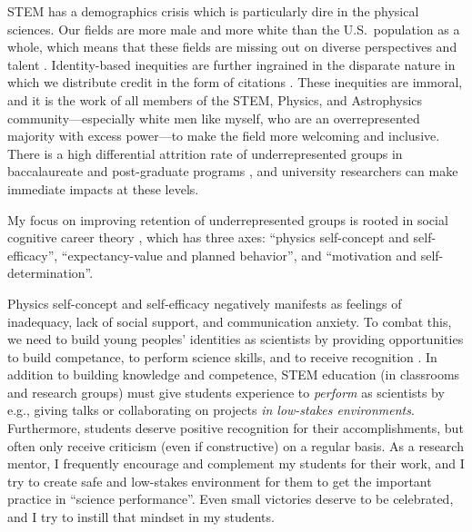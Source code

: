 \documentclass[11pt]{article}
\begin{document}
\thispagestyle{fancy}

\vspace{-0.2cm}
STEM has a demographics crisis which is particularly dire in the physical sciences. 
Our fields are more male and more white than the U.S.~population as a whole, which means that these fields are missing out on diverse perspectives and talent \citep{stem_laborforce_2021}. 
Identity-based inequities are further ingrained in the disparate nature in which we distribute credit in the form of citations \citep{teich_etal_2022}.
These inequities are immoral, and it is the work of all members of the STEM, Physics, and Astrophysics community---especially white men like myself, who are an overrepresented majority with excess power---to make the field more welcoming and inclusive.
There is a high differential attrition rate of underrepresented groups in baccalaureate and post-graduate programs \citep{whitcomb_singh_2021}, and university researchers can make immediate impacts at these levels.

My focus on improving retention of underrepresented groups is rooted in social cognitive career theory \citep{kelly_2016}, which has three axes: ``physics self-concept and self-efficacy'', ``expectancy-value and planned behavior'', and ``motivation and self-determination''.

Physics self-concept and self-efficacy negatively manifests as feelings of inadequacy, lack of social support, and communication anxiety.
To combat this, we need to build young peoples' identities as scientists by providing opportunities to build competance, to perform science skills, and to receive recognition  \citep{hazari_etal_2010}.
In addition to building knowledge and competence, STEM education (in classrooms and research groups) must give students experience to \emph{perform} as scientists by e.g., giving talks or collaborating on projects \emph{in low-stakes environments}.
Furthermore, students deserve positive recognition for their accomplishments, but often only receive criticism (even if constructive) on a regular basis.
As a research mentor, I frequently encourage and complement my students for their work, and I try to create safe and low-stakes environment for them to get the important practice in ``science performance''. 
Even small victories deserve to be celebrated, and I try to instill that mindset in my students.
\end{document}
